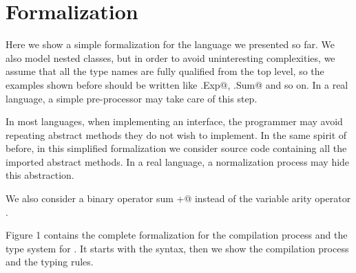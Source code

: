 \saveSpace\saveSpace\section{Formalization}\label{sec:formal}
\saveSpace\saveSpace

Here we show a simple formalization for the language we presented so far.
We also model nested classes, but in order to avoid uninteresting complexities, we assume that
all the type names are fully qualified from the top level, so the examples shown before should be
written like \Q@This.Exp@, \Q@This.Sum@ and so on.
In a real language, a simple pre-processor may take care of this step.

In most languages, when implementing an interface, the programmer may avoid repeating abstract methods
they do not wish to implement.
In the same spirit of before, in this simplified formalization we consider source code containing
all the imported abstract methods. In a real language, a normalization process
may hide this abstraction.

We also consider a binary operator sum \Q@+@ instead of the variable arity operator \Q@use@.

Figure 1 contains the complete formalization for the 
compilation process and the type system for \name.
It starts with the syntax, then
we show the compilation process and the typing rules.




